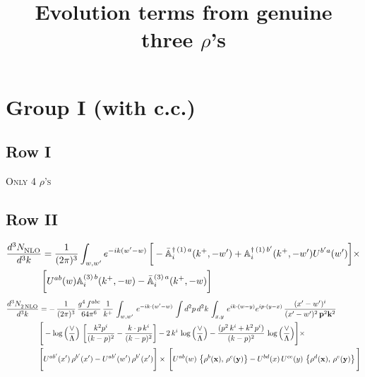 \documentclass[9pt]{article}
\title{Evolution terms from genuine three $\rho$'s}
\author{}
\date{}
\def\mf#1{\mathbb{#1}}
\numberwithin{equation}{section}
\begin{document}
\maketitle
\section{Group I (with c.c.)}
\subsection{Row I}
\textsc{Only 4 $\rho$'s}
\subsection{{\color{red}Row II}}
\begin{align}
    \frac{d^{3}N_{\rm NLO}^{\rm}}{d^{3}k} &  = \frac{1}{(2\pi)^{3}}  \int_{w, w^\prime} e^{-ik(w^\prime-w)}\,\bigg[-\bar{\mf{A}}^{\dagger\,(1)\,a}_{i}(k^{+},-w^{\prime})+\mf{A}^{\dagger\, (1)\, b^{\prime}}_{i}(k^{+},-w^{\prime})U^{b^{\prime}a}(w^{\prime})\bigg]\times \notag \\ & \bigg[U^{ab}(w)\mf{A}^{(3)\, b}_{i}(k^{+},- w)-\Bar{\mf{A}}^{(3)\, a}_{i}(k^{+}, - w)\bigg]\nonumber
\end{align}
\begin{align}
   \frac{d^{3}N_{2\,\rm NLO}^{\rm}}{d^{3}k} &  = -\,\frac{1}{(2\pi)^{3}}\,\frac{g^{4}\,f^{abc}}{64\pi^{6}}\, \frac{1}{k^{+}}\,\int_{w,w'}\, e^{-ik\cdot (w'-w)}\,\int d^{2}p\,d^{2}k\,\int_{x,y}\, e^{ik\cdot (w-y)} e^{ip\cdot (y-x)}\, \frac{(x'-w')^{i}}{(x'-w')^{2}\,\mathbf{p}^{2}\mathbf{k}^{2} }\notag \\ & \Bigg[-\log{\left(\frac{\vee}{\Lambda}\right)}\,\left[\frac{k^{2}p^{i}}{(k-p)^{2}}-\frac{k\cdot p\,k^{i}}{(k-p)^{2}}\right]-2\,k^{i}\,\log{\left(\frac{\vee}{\Lambda}\right)}   - \frac{(p^{2}\,k^{i}+k^{2}\,p^{i})}{(k-p)^{2}}\, \log{\left(\frac{\vee}{\Lambda}\right)}\Bigg]\times\notag \\ & \Bigg[U^{ab'}(x')\,\rho^{b'}(x') - U^{ab'}(w')\,\rho^{b'}(x')\Bigg]\times\,\Bigg[U^{ab}(w)\,\left\{ \rho^{b}(\mathbf{x}),\,\rho^{c}(\mathbf{y})\right\}-U^{bd}(x)\, U^{ce}(y)\, \left\{\rho^{d}(\mathbf{x}),\,\rho^{e}(\mathbf{y})\right\}\Bigg]
\end{align}
\end{document}
